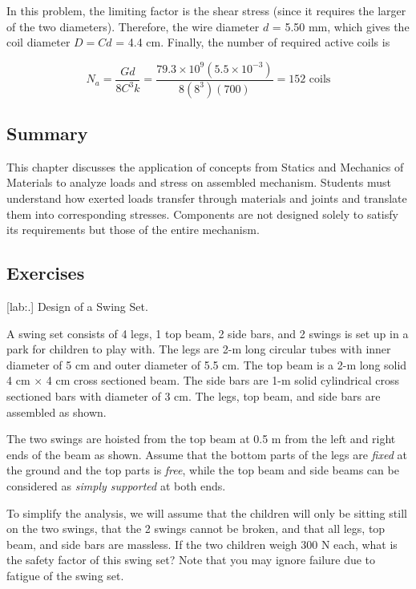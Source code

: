 \documentclass[a4paper,openany,nobib]{tufte-book}
\begin{document}
{{\begin{enumerate}
In this problem, the limiting factor is the shear stress (since it
requires the larger of the two diameters). Therefore, the wire diameter
\(d\) = 5.50 mm, which gives the coil diameter \(D = Cd\) = 4.4 cm. Finally,
the number of required active coils is

$$N_a = \frac{Gd}{8C^3k} = \frac{79.3 \times 10^9(5.5 \times 10^{-3})}{8(8^3)(700)} = 152\text{ coils}$$
\end{enumerate}

\subsection{Summary}
\label{summary-8}
This chapter discusses the application of concepts from Statics and
Mechanics of Materials to analyze loads and stress on assembled
mechanism. Students must understand how exerted loads transfer through
materials and joints and translate them into corresponding stresses.
Components are not designed solely to satisfy its requirements but those
of the entire mechanism.

\subsection{Exercises}
\label{exercises-8}
[lab:.] Design of a Swing Set.

A swing set consists of 4 legs, 1 top beam, 2 side bars, and 2 swings is
set up in a park for children to play with. The legs are 2-m long
circular tubes with inner diameter of 5 cm and outer diameter of 5.5 cm.
The top beam is a 2-m long solid 4 cm \(\times\) 4 cm cross sectioned
beam. The side bars are 1-m solid cylindrical cross sectioned bars with
diameter of 3 cm. The legs, top beam, and side bars are assembled as
shown.

The two swings are hoisted from the top beam at 0.5 m from the left and
right ends of the beam as shown. Assume that the bottom parts of the
legs are \emph{fixed} at the ground and the top parts is \emph{free}, while the
top beam and side beams can be considered as \emph{simply supported} at both
ends.

To simplify the analysis, we will assume that the children will only be
sitting still on the two swings, that the 2 swings cannot be broken, and
that all legs, top beam, and side bars are massless. If the two children
weigh 300 N each, what is the safety factor of this swing set? Note that
you may ignore failure due to fatigue of the swing set.

}}
\end{document}
